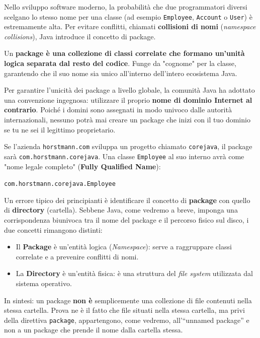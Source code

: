 Nello sviluppo software moderno, la probabilità che due programmatori diversi scelgano lo stesso nome per una classe (ad esempio \texttt{Employee}, \texttt{Account} o \texttt{User}) è estremamente alta. Per evitare conflitti, chiamati \textbf{collisioni di nomi} (\textit{namespace collisions}), Java introduce il concetto di package.

Un \textbf{package è una collezione di classi correlate che formano un'unità logica separata dal resto del codice}. Funge da "cognome" per la classe, garantendo che il suo nome sia unico all'interno dell'intero ecosistema Java.

Per garantire l'unicità dei package a livello globale, la comunità Java ha adottato una convenzione ingegnosa: utilizzare il proprio \textbf{nome di dominio Internet al contrario}.
Poiché i domini sono assegnati in modo univoco dalle autorità internazionali, nessuno potrà mai creare un package che inizi con il tuo dominio se tu ne sei il legittimo proprietario.

\begin{example}
    Se l'azienda \texttt{horstmann.com} sviluppa un progetto chiamato \texttt{corejava}, il package sarà \texttt{com.horstmann.corejava}. Una classe \texttt{Employee} al suo interno avrà come "nome legale completo" (\textbf{Fully Qualified Name}):
    \begin{center}
        \texttt{com.horstmann.corejava.Employee}
    \end{center}
\end{example}

\begin{caution}
Un errore tipico dei principianti è identificare il concetto di \textbf{package} con quello di \textbf{directory} (cartella). Sebbene Java, come vedremo a breve, imponga una corrispondenza biunivoca tra il nome del package e il percorso fisico sul disco, i due concetti rimangono distinti:
\begin{itemize}
    \item Il \textbf{Package} è un'entità logica (\textit{Namespace}): serve a raggruppare classi correlate e a prevenire conflitti di nomi.
    \item La \textbf{Directory} è un'entità fisica: è una struttura del \textit{file system} utilizzata dal sistema operativo.
\end{itemize}
In sintesi: un package \textbf{non è} semplicemente una collezione di file contenuti nella stessa cartella. Prova ne è il fatto che file situati nella stessa cartella, ma privi della direttiva \texttt{package}, appartengono, come vedremo, all'``unnamed package'' e non a un package che prende il nome dalla cartella stessa.
\end{caution}


